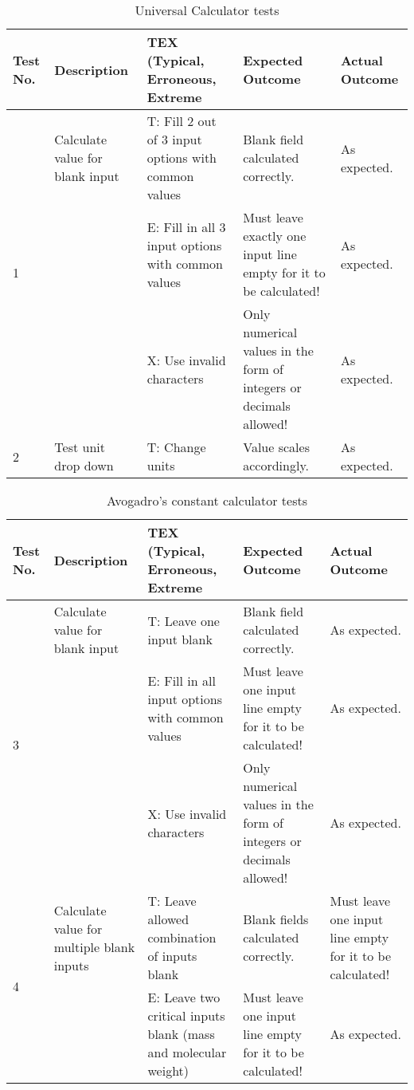 \documentclass[a4paper,12pt]{article}
\begin{document}
\begin{table}[htbp]
\centering
\begin{tabularx}{\textwidth}{|p{1cm}|X|X|X|X|}
\hline
\textbf{Test No.} & \textbf{Description} & \textbf{TEX (Typical, Erroneous, Extreme} & \textbf{Expected Outcome} & \textbf{Actual Outcome} \\
\hline
\multirow{3}{*}{1} & Calculate value for blank input & T: Fill 2 out of 3 input options with common values & Blank field calculated correctly. & As expected.\\
\cline{3-5}
& & E: Fill in all 3 input options with common values & Must leave exactly one input line empty for it to be calculated! & As expected.\\
\cline{3-5}
& & X: Use invalid characters & Only numerical values in the form of integers or decimals allowed! & As expected.\\

\hline

\multirow{3}{*}{2} & Test unit drop down  & T: Change units & Value scales accordingly. & As expected.\\

\hline
\end{tabularx}
\caption{Universal Calculator tests}
\label{tab:calculator_tests}
\end{table}

\begin{table}[htbp]
\centering
\begin{tabularx}{\textwidth}{|p{1cm}|X|X|X|X|}
\hline
\textbf{Test No.} & \textbf{Description} & \textbf{TEX (Typical, Erroneous, Extreme} & \textbf{Expected Outcome} & \textbf{Actual Outcome} \\
\hline
\multirow{3}{*}{3} & Calculate value for blank input & T: Leave one input blank & Blank field calculated correctly. & As expected.\\
\cline{3-5}
& & E: Fill in all input options with common values & Must leave one input line empty for it to be calculated! & As expected.\\
\cline{3-5}
& & X: Use invalid characters & Only numerical values in the form of integers or decimals allowed! & As expected.\\

\hline
\multirow{3}{*}{4} & Calculate value for multiple blank inputs & T: Leave allowed combination of inputs blank & Blank fields calculated correctly. & Must leave one input line empty for it to be calculated!\\
\cline{3-5}
& & E: Leave two critical inputs blank (mass and molecular weight) & Must leave one input line empty for it to be calculated! & As expected.\\
\hline
\end{tabularx}
\caption{Avogadro's constant calculator tests}
\label{tab:avogadros_tests}
\end{table}
\end{document}
